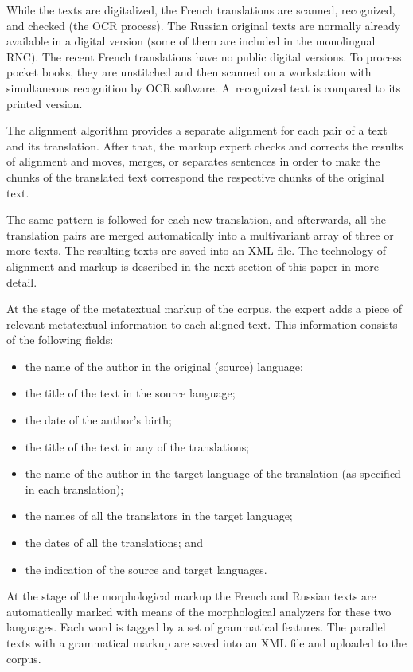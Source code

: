 \begin{multicols}{2}
   While the texts are digitalized, the French translations are scanned, recognized, and checked (the 
OCR process). The Russian original texts are normally already available in a digital version (some 
of them are included in the monolingual RNC). The recent French translations have no public 
digital versions. To process pocket books, they are unstitched and then scanned on a workstation 
with simultaneous recognition by OCR software. A~recognized text is compared to its printed 
version.
   
   The alignment algorithm provides a separate alignment for each pair of a text and its translation. 
After that, the markup expert checks and corrects the results of alignment and moves, merges, or 
separates sentences in order to make the chunks of the translated text correspond the respective 
chunks of the original text.
   
   The same pattern is followed for each new translation, and afterwards, all the translation pairs 
are merged automatically into a multivariant array of three or more texts. The resulting texts are 
saved into an XML file. The technology of alignment and markup is described in the next section of 
this paper in more detail.
   
   At the stage of the metatextual markup of the corpus, the expert adds a piece of relevant 
metatextual information to each aligned text. This information consists of the following fields:
   \begin{itemize}
\item the name of the author in the original (source) language;
\item the title of the text in the source language;
\item the date of the author's birth;
\item the title of the text in any of the translations;
\item the name of the author in the target language of the translation (as specified in each 
translation);
\item the names of all the translators in the target language;
\item the dates of all the translations; and
\item the indication of the source and target languages.
\end{itemize}
   
   At the stage of the morphological markup the French and Russian texts are automatically 
marked with means of the morphological analyzers for these two languages. Each word is tagged by 
a set of grammatical features. The parallel texts with a grammatical markup are saved into an XML 
file and uploaded to the corpus.
   

\end{multicols}
